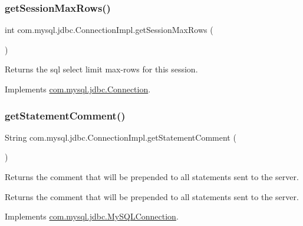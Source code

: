 \mbox{\label{classcom_1_1mysql_1_1jdbc_1_1_connection_impl_a7fc47c9a352c1cd244637860dda48c68}} 
\subsubsection{\texorpdfstring{get\+Session\+Max\+Rows()}{getSessionMaxRows()}}
{\footnotesize\ttfamily int com.\+mysql.\+jdbc.\+Connection\+Impl.\+get\+Session\+Max\+Rows (\begin{DoxyParamCaption}{ }\end{DoxyParamCaption})}

Returns the sql select limit max-\/rows for this session. 

Implements \mbox{\hyperlink{interfacecom_1_1mysql_1_1jdbc_1_1_connection}{com.\+mysql.\+jdbc.\+Connection}}.

\mbox{\label{classcom_1_1mysql_1_1jdbc_1_1_connection_impl_af8522a313fec84a2460afa40889e3595}} 
\subsubsection{\texorpdfstring{get\+Statement\+Comment()}{getStatementComment()}}
{\footnotesize\ttfamily String com.\+mysql.\+jdbc.\+Connection\+Impl.\+get\+Statement\+Comment (\begin{DoxyParamCaption}{ }\end{DoxyParamCaption})}

Returns the comment that will be prepended to all statements sent to the server.

\begin{DoxyReturn}{Returns}
the comment that will be prepended to all statements sent to the server. 
\end{DoxyReturn}


Implements \mbox{\hyperlink{interfacecom_1_1mysql_1_1jdbc_1_1_my_s_q_l_connection_aca7bbebb7ec6fa745218e6dca38cfaad}{com.\+mysql.\+jdbc.\+My\+S\+Q\+L\+Connection}}.

